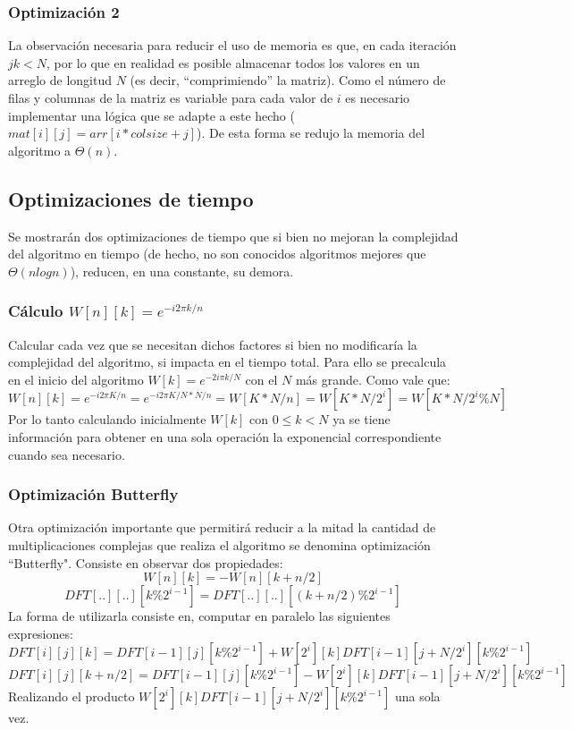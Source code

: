 \documentclass[assd_tp2_main.tex]{subfiles}
\begin{document}
\subsubsection{Optimización 2}
La observación necesaria para reducir el uso de memoria es que, en cada iteración $jk<N$, por lo que en realidad es posible almacenar todos los valores en un arreglo de longitud $N$ (es decir, ``comprimiendo'' la matriz). Como el número de filas y columnas de la matriz es variable para cada valor de $i$ es necesario implementar una lógica que se adapte a este hecho ($mat[i][j]=arr[i*colsize+j]$).
De esta forma se redujo la memoria del algoritmo a $\Theta(n)$.

\subsection{Optimizaciones de tiempo}
Se mostrarán dos optimizaciones de tiempo que si bien no mejoran la complejidad del algoritmo en tiempo (de hecho, no son conocidos algoritmos mejores que $\Theta(nlogn)$), reducen, en una constante, su demora.
\subsubsection{Cálculo $W[n][k]=e^{-i2\pi k/n}$}
Calcular cada vez que se necesitan dichos factores si bien no modificaría la complejidad del algoritmo, si impacta en el tiempo total.
Para ello se precalcula en el inicio del algoritmo $W[k]=e^{-2i\pi k/N}$ con el $N$ más grande. Como vale que:
\begin{equation}
W[n][k]=e^{-i2\pi K/n}=e^{-i2\pi K/N*N/n}=W[K*N/n]=W[K*N/2^{i}]=W[K*N/2^{i}\%N]
\end{equation}
Por lo tanto calculando inicialmente $W[k]$ con $0\leq k <N$ ya se tiene información para obtener en una sola operación la exponencial correspondiente cuando sea necesario.

\subsubsection{Optimización Butterfly}
Otra optimización importante que permitirá reducir a la mitad la cantidad de multiplicaciones complejas que realiza el algoritmo se denomina optimización ``Butterfly". Consiste en observar dos propiedades:
\begin{equation}
W[n][k]=-W[n][k+n/2]
\end{equation}
\begin{equation}
DFT[..][..][k\%2^{i-1}]=DFT[..][..][(k+n/2)\%2^{i-1}]
\end{equation}
La forma de utilizarla consiste en, computar en paralelo las siguientes expresiones:
\begin{equation}
DFT[i][j][k] = DFT[i-1][j][k\%2^{i-1}] + W[2^i][k] DFT[i-1][j+N/2^{i}][k\%2^{i-1}] 
\end{equation}
\begin{equation}
DFT[i][j][k+n/2] = DFT[i-1][j][k\%2^{i-1}] - W[2^i][k] DFT[i-1][j+N/2^{i}][k\%2^{i-1}]
\end{equation}
Realizando el producto $W[2^i][k] DFT[i-1][j+N/2^{i}][k\%2^{i-1}]$ una sola vez.
\end{document}
